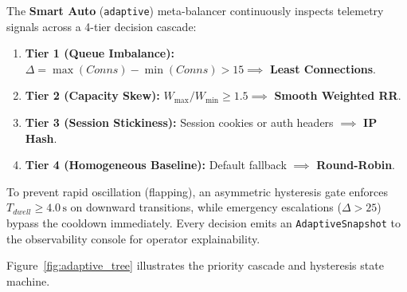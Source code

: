 \documentclass[12pt,openany]{report}
\begin{document}
The \textbf{Smart Auto} (\texttt{adaptive}) meta-balancer continuously inspects telemetry signals across a 4-tier decision cascade:
\begin{enumerate}
  \item \textbf{Tier 1 (Queue Imbalance):} $\Delta = \max(Conns) - \min(Conns) > 15 \implies$ \textbf{Least Connections}.
  \item \textbf{Tier 2 (Capacity Skew):} $W_{\max}/W_{\min} \ge 1.5 \implies$ \textbf{Smooth Weighted RR}.
  \item \textbf{Tier 3 (Session Stickiness):} Session cookies or auth headers $\implies$ \textbf{IP Hash}.
  \item \textbf{Tier 4 (Homogeneous Baseline):} Default fallback $\implies$ \textbf{Round-Robin}.
\end{enumerate}

To prevent rapid oscillation (flapping), an asymmetric hysteresis gate enforces $T_{dwell} \ge 4.0\,\text{s}$ on downward transitions, while emergency escalations ($\Delta > 25$) bypass the cooldown immediately. Every decision emits an \texttt{AdaptiveSnapshot} to the observability console for operator explainability.

Figure~\ref{fig:adaptive_tree} illustrates the priority cascade and hysteresis state machine.
\end{document}

